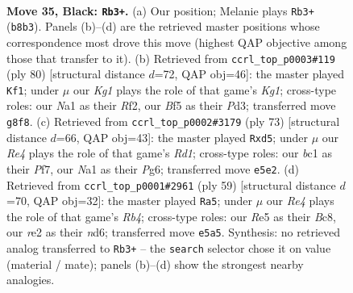 \documentclass[11pt]{article}
\begin{document}
\clearpage

\begin{figure}[p]\centering
\begin{subfigure}{0.46\textwidth}\centering
\resizebox{\linewidth}{!}{%
\newchessgame
\chessboard[
  setfen={1r4k1/p1p2pp1/7p/4rb1P/p1P3n1/2K5/4R3/n1B2BN1 b - - 1 35},
  showmover=false,
  pgfstyle=straightmove, color=movearrow, markmove={b8-b3}
]}
\caption{}
\end{subfigure}\hfill
\begin{subfigure}{0.46\textwidth}\centering
\resizebox{\linewidth}{!}{%
\newchessgame
\chessboard[
  setfen={1r6/4r1k1/6bn/2N5/2NnB1p1/3P2Pp/5R1P/R5K1 w - - 1 41},
  showmover=false,
  pgfstyle=straightmove, color=movearrow, markmove={g1-f1}
]}
\caption{}
\end{subfigure}
\\[4pt]
\begin{subfigure}{0.46\textwidth}\centering
\resizebox{\linewidth}{!}{%
\newchessgame
\chessboard[
  setfen={3r2k1/p1b2p1p/4n1pP/1p1R2P1/1B2B1K1/8/PP6/8 b - - 16 37},
  showmover=false,
  pgfstyle=straightmove, color=movearrow, markmove={d8-d5}
]}
\caption{}
\end{subfigure}\hfill
\begin{subfigure}{0.46\textwidth}\centering
\resizebox{\linewidth}{!}{%
\newchessgame
\chessboard[
  setfen={2br2k1/p1n4p/3Nppp1/1r6/7P/B5P1/P4PB1/2R3K1 b - - 1 30},
  showmover=false,
  pgfstyle=straightmove, color=movearrow, markmove={b5-a5}
]}
\caption{}
\end{subfigure}
\caption{\textbf{Move 35, Black: \texttt{Rb3+}.} (a) Our position; Melanie plays \texttt{Rb3+} (\texttt{b8b3}). Panels (b)--(d) are the retrieved master positions whose correspondence most drove this move (highest QAP objective among those that transfer to it). (b) Retrieved from \texttt{ccrl\_top\_p0003\#119} (ply 80) [structural distance $d$=72, QAP obj=46]: the master played \texttt{Kf1}; under $\mu$ our \emph{Kg1} plays the role of that game's \emph{Kg1}; cross-type roles: our \emph{N}a1 as their \emph{R}f2, our \emph{B}f5 as their \emph{P}d3; transferred move \texttt{g8f8}. (c) Retrieved from \texttt{ccrl\_top\_p0002\#3179} (ply 73) [structural distance $d$=66, QAP obj=43]: the master played \texttt{Rxd5}; under $\mu$ our \emph{Re4} plays the role of that game's \emph{Rd1}; cross-type roles: our \emph{b}c1 as their \emph{P}f7, our \emph{N}a1 as their \emph{P}g6; transferred move \texttt{e5e2}. (d) Retrieved from \texttt{ccrl\_top\_p0001\#2961} (ply 59) [structural distance $d$=70, QAP obj=32]: the master played \texttt{Ra5}; under $\mu$ our \emph{Re4} plays the role of that game's \emph{Rb4}; cross-type roles: our \emph{R}e5 as their \emph{B}c8, our \emph{r}e2 as their \emph{n}d6; transferred move \texttt{e5a5}. Synthesis: no retrieved analog transferred to \texttt{Rb3+} -- the \texttt{search} selector chose it on value (material / mate); panels (b)--(d) show the strongest nearby analogies.}
\label{fig:thought-m69}
\end{figure}
\end{document}
